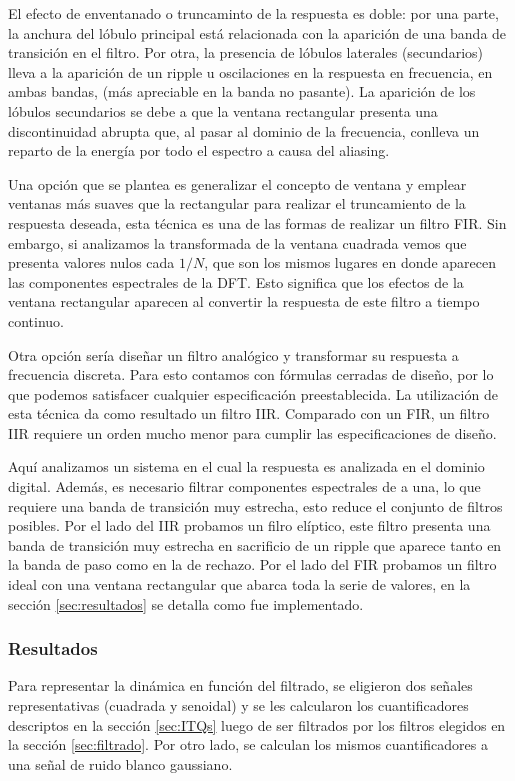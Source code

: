 El efecto de enventanado o truncaminto de la respuesta es doble: por una parte, la anchura del lóbulo principal está relacionada con la aparición de una banda de transición en el filtro. Por otra, la presencia de lóbulos laterales (secundarios) lleva a la aparición de un ripple u oscilaciones en la respuesta en frecuencia, en ambas bandas, (más apreciable en la banda no pasante).
La aparición de los lóbulos secundarios se debe a que la ventana rectangular presenta una discontinuidad abrupta que, al pasar al dominio de la frecuencia, conlleva un reparto de la energía por todo el espectro a causa del aliasing.

Una opción que se plantea es generalizar el concepto de ventana y emplear ventanas más suaves que la rectangular para realizar el truncamiento de la respuesta deseada, esta técnica es una de las formas de realizar un filtro FIR.
Sin embargo, si analizamos la transformada de la ventana cuadrada vemos que presenta valores nulos cada $1/N$, que son los mismos lugares en donde aparecen las componentes espectrales de la DFT. Esto significa que los efectos de la ventana rectangular aparecen al convertir la respuesta de este filtro a tiempo continuo.

Otra opción sería diseñar un filtro analógico y transformar su respuesta a frecuencia discreta. Para esto contamos con fórmulas cerradas de diseño, por lo que podemos satisfacer cualquier especificación preestablecida. La utilización de esta técnica da como resultado un filtro IIR. Comparado con un FIR, un filtro IIR requiere un orden mucho menor para cumplir las especificaciones de diseño.

Aquí analizamos un sistema en el cual la respuesta es analizada en el dominio digital. Además, es necesario filtrar componentes espectrales de a una, lo que requiere una banda de transición muy estrecha, esto reduce el conjunto de filtros posibles. Por el lado del IIR probamos un filro elíptico, este filtro presenta una banda de transición muy estrecha en sacrificio de un ripple que aparece tanto en la banda de paso como en la de rechazo. Por el lado del FIR probamos un filtro ideal con una ventana rectangular que abarca toda la serie de valores, en la sección \ref{sec:resultados} se detalla como fue implementado.

\subsubsection{Resultados}

Para representar la dinámica en función del filtrado, se eligieron dos señales representativas (cuadrada y senoidal) y se les calcularon los cuantificadores descriptos en la sección \ref{sec:ITQs} luego de ser filtrados por los filtros elegidos en la sección \ref{sec:filtrado}. Por otro lado, se calculan los mismos cuantificadores a una señal de ruido blanco gaussiano.

